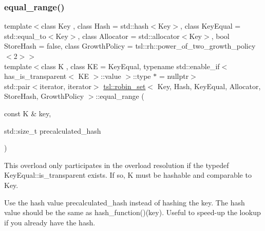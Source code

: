 \subsubsection{\texorpdfstring{equal\_range()}{equal\_range()}\hspace{0.1cm}{\footnotesize\ttfamily [4/6]}}
{\footnotesize\ttfamily template$<$class Key , class Hash  = std\+::hash$<$\+Key$>$, class Key\+Equal  = std\+::equal\+\_\+to$<$\+Key$>$, class Allocator  = std\+::allocator$<$\+Key$>$, bool Store\+Hash = false, class Growth\+Policy  = tsl\+::rh\+::power\+\_\+of\+\_\+two\+\_\+growth\+\_\+policy$<$2$>$$>$ \\
template$<$class K , class KE  = Key\+Equal, typename std\+::enable\+\_\+if$<$ has\+\_\+is\+\_\+transparent$<$ K\+E $>$\+::value $>$\+::type $\ast$  = nullptr$>$ \\
std\+::pair$<$iterator, iterator$>$ \mbox{\hyperlink{classtsl_1_1robin__set}{tsl\+::robin\+\_\+set}}$<$ Key, Hash, Key\+Equal, Allocator, Store\+Hash, Growth\+Policy $>$\+::equal\+\_\+range (\begin{DoxyParamCaption}\item[{const K \&}]{key,  }\item[{std\+::size\+\_\+t}]{precalculated\+\_\+hash }\end{DoxyParamCaption})\hspace{0.3cm}{\ttfamily [inline]}}





This overload only participates in the overload resolution if the typedef Key\+Equal\+::is\+\_\+transparent exists. If so, K must be hashable and comparable to Key.

Use the hash value \textquotesingle{}precalculated\+\_\+hash\textquotesingle{} instead of hashing the key. The hash value should be the same as hash\+\_\+function()(key). Useful to speed-\/up the lookup if you already have the hash. \mbox{\label{classtsl_1_1robin__set_ae94df1b2b5d47ac44eecca743871c6c5}} 

